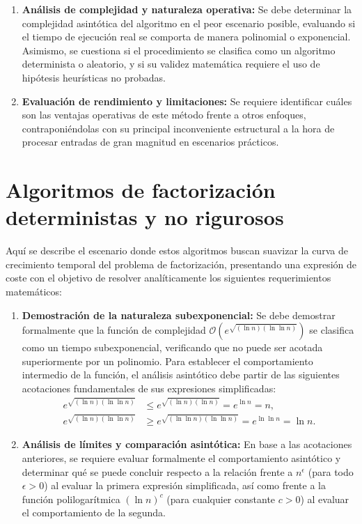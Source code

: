 \documentclass[11pt,a4paper,spanish]{book}
\begin{document}
\begin{enumerate}
    \item \textbf{Análisis de complejidad y naturaleza operativa:} Se debe determinar la complejidad asintótica del algoritmo en el peor escenario posible, evaluando si el tiempo de ejecución real se comporta de manera polinomial o exponencial. Asimismo, se cuestiona si el procedimiento se clasifica como un algoritmo determinista o aleatorio, y si su validez matemática requiere el uso de hipótesis heurísticas no probadas.
    
    \item \textbf{Evaluación de rendimiento y limitaciones:} Se requiere identificar cuáles son las ventajas operativas de este método frente a otros enfoques, contraponiéndolas con su principal inconveniente estructural a la hora de procesar entradas de gran magnitud en escenarios prácticos.
\end{enumerate}

\section{Algoritmos de factorización deterministas y no rigurosos}
Aquí se describe el escenario donde estos algoritmos buscan suavizar la curva de crecimiento temporal del problema de factorización, presentando una expresión de coste con el objetivo de resolver analíticamente los siguientes requerimientos matemáticos:

\begin{enumerate}
    \item \textbf{Demostración de la naturaleza subexponencial:} Se debe demostrar formalmente que la función de complejidad $\mathcal{O} \left(e^{\sqrt{(\ln n) (\ln \ln n)}}\right)$ se clasifica como un tiempo subexponencial, verificando que no puede ser acotada superiormente por un polinomio. Para establecer el comportamiento intermedio de la función, el análisis asintótico debe partir de las siguientes acotaciones fundamentales de sus expresiones simplificadas:
    $$\begin{aligned}
        e^{\sqrt{(\ln n) (\ln \ln n)}} & \leq e^{\sqrt{(\ln n) (\ln n)}} = e^{\ln n} = n, \\
        e^{\sqrt{(\ln n) (\ln \ln n)}} & \geq e^{\sqrt{(\ln \ln n) (\ln \ln n)}} = e^{\ln \ln n} = \ln n.
    \end{aligned}$$
    
    \item \textbf{Análisis de límites y comparación asintótica:} En base a las acotaciones anteriores, se requiere evaluar formalmente el comportamiento asintótico y determinar qué se puede concluir respecto a la relación frente a $n^{\epsilon}$ (para todo $\epsilon > 0$) al evaluar la primera expresión simplificada, así como frente a la función polilogarítmica $(\ln n)^c$ (para cualquier constante $c > 0$) al evaluar el comportamiento de la segunda.
\end{enumerate}
\end{document}
